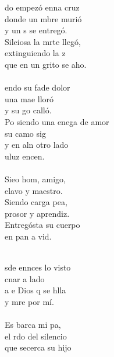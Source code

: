 \begin{cancion}%
	do empezó enna cruz\\
	donde un mbre murió\\
	y un s se entregó.\\
	Sileiosa la mrte llegó,\\
	extinguiendo la z\\
	que en un grito se aho.\\
\jump\\
	endo su fade dolor\\
	una mae lloró\\
	y su go calló.\\
	Po siendo una enega de amor\\
	su camo sig \\
	y en aln otro lado \\
	uluz  encen. \\
\jump\\
	Sieo hom, amigo,\\
	elavo y maestro.\\
	Siendo carga pea,\\
	prosor y aprendiz.\\
	Entregósta su cuerpo\\
	en  pan a vid.\\\jump\\
	\begin{chorus}%
	sde ennces lo  visto\\
	cnar a  lado\\
	a e Dios q se hlla\\
	y mre por mí.\\
\jump\\
	Es  barca  mi pa,\\
	el rdo del silencio\\
	que secerca su hijo\\

\end{chorus}
\end{cancion}
